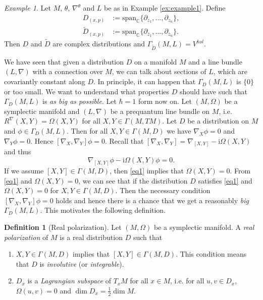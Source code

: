 \documentclass[12pt]{amsart}
\numberwithin{equation}{section}
\theoremstyle{plain}
\theoremstyle{definition}
\newtheorem{defn}{Definition}[subsection]
\theoremstyle{remark}
\newtheorem{ex}{Example}[subsection]
\newcommand{\I}{\mathrm{i}}
\begin{document}
\begin{ex}
Let $M$, $\theta$, $\nabla^\theta$ and $L$ be as in Example \ref{ex:example1}. Define
\begin{align*}
D_{(x,p)}&:=\mathrm{span}_\mathbb{C}\{\partial_{z_1},...,\partial_{z_n}\},\\
\widetilde{D}_{(x,p)}&:=\mathrm{span}_\mathbb{C}\{\partial_{\bar z_1},...,\partial_{\bar z_n}\}.
\end{align*}
Then $D$ and $\widetilde{D}$ are complex distributions and $\Gamma_{\widetilde{D}}(M,L)= V^{hol}$.
\end{ex}

We have seen that given a distribution $D$ on a manifold $M$ and a line bundle $(L,\nabla)$ with a connection over $M$, we can talk about sections of $L$, which are covariantly constant along $D$. In principle, it can happen that $\Gamma_D(M,L)$ is $\{0\}$ or too small. We want to understand what properties $D$ should have such that $\Gamma_D(M,L)$ is \emph{as big as possible}. Let $\hbar=1$ form now on. Let $(M,\Omega)$ be a symplectic manifold and $(L,\nabla)$ be a prequantum line bundle on $M$, i.e. $R^\nabla(X,Y)=\Omega(X,Y)$ for all $X,Y\in\Gamma(M,TM)$. Let $D$ be a distribution on $M$ and $\phi\in\Gamma_D(M,L)$. Then for all $X,Y\in\Gamma(M,D)$ we have $\nabla_X\phi=0$ and $\nabla_Y\phi=0$. Hence $[\nabla_X,\nabla_Y]\phi=0$. Recall that $[\nabla_X,\nabla_Y]=\nabla_{[X,Y]}-\I\Omega(X,Y)$ and thus 
\begin{equation}
\label{eq1}
\nabla_{[X,Y]}\phi-\I\Omega(X,Y)\phi=0.
\end{equation}
If we assume $[X,Y]\in\Gamma(M,D)$, then \eqref{eq1} implies that $\Omega(X,Y)=0$. From \eqref{eq1} and $\Omega(X,Y)=0$, we can see that if the distribution $D$ satisfies \eqref{eq1} and $\Omega(X,Y)=0$ for $X,Y\in\Gamma(M,D)$. Then the necessary condition $[\nabla_X,\nabla_Y]\phi=0$ holds and hence there is a chance that we get a reasonably \emph{big} $\Gamma_D(M,L)$. This motivates the following definition.

\begin{defn}[Real polarization]
Let $(M,\Omega)$ be a symplectic manifold. A \emph{real polarization} of $M$ is a real distribution $D$ such that 
\begin{enumerate}
\item{$X,Y\in\Gamma(M,D)$ implies that $[X,Y]\in\Gamma(M,D)$. This condition means that $D$ is \emph{involutive} (or \emph{integrable}).
}
\item{$D_x$ is a \emph{Lagrangian subspace} of $T_xM$ for all $x\in M$, i.e. for all $u,v\in D_x$, $\Omega(u,v)=0$ and $\dim D_x=\frac{1}{2}\dim M$.}
\end{enumerate}
\end{defn}
\end{document}
